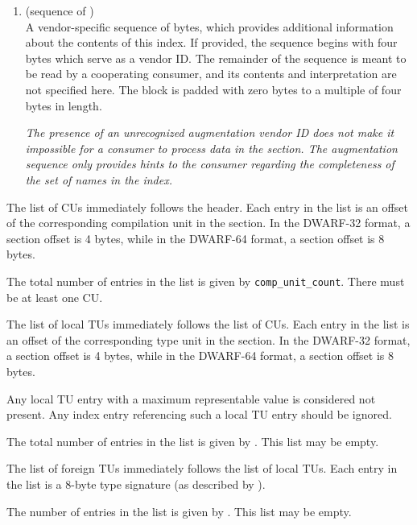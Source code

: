 \begin{enumerate}[1. ]
\item 
\bbeb
\HFNaugmentation{} (sequence of \HFTubyte) \\
A vendor-specific 
\bb
sequence of bytes, 
\eb
which provides additional information about the contents of 
this index. If provided, the sequence begins with 
\bb
four bytes which serve as a
\eb
vendor ID. The remainder of the
\bb
sequence
\eb
is meant to be read by a cooperating consumer, and its
contents and interpretation are not specified here. The
\bb
block is padded with zero bytes 
\eb
to a multiple of four bytes in length.

\textit{The presence of an unrecognized augmentation 
\bb
vendor ID
\eb 
does not make it
impossible for a consumer to process data in the \dotdebugnames{} section.
The augmentation 
\db
sequence only provides hints to the consumer regarding
the completeness of the set of names in the index.}

\end{enumerate}

The list of CUs immediately follows the header. Each entry in the 
list is an offset of the corresponding compilation unit
in the \dotdebuginfo{} section.
In the DWARF-32 format, a section offset is 4 bytes, 
while in the DWARF-64 format, a section offset is 8 bytes.

The total number of entries in the list is given by \texttt{comp\_unit\_count}.
There must be at least one CU.

The list of local TUs immediately follows the list of CUs. Each 
entry in the list is an offset of the corresponding type unit
in the \dotdebuginfo{} section. 
In the DWARF-32 format, a section offset is 4 bytes, 
while in the DWARF-64 format, a section offset is 8 bytes.

\bb
Any local TU entry with a maximum representable value is 
considered not present. Any index entry referencing such 
a local TU entry should be ignored.
\eb

The total number of entries in the list is given by
\HFNlocaltypeunitcount{}. This list may be empty.

The list of foreign TUs immediately follows the list of local TUs.
Each entry in the list is a 8-byte type signature (as described by
\DWFORMrefsigeight).

The number of entries in the list is given by \HFNforeigntypeunitcount{}.
This list may be empty.

